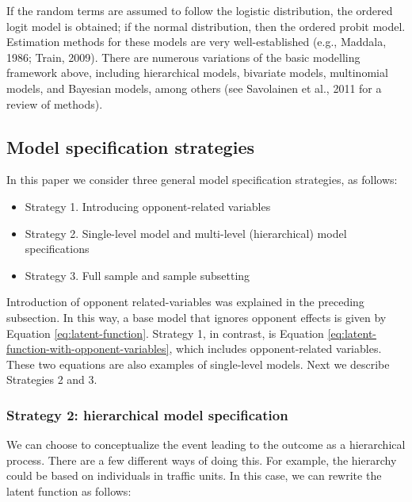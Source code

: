\documentclass[]{elsarticle} %
\providecommand{\tightlist}{%
  \setlength{\itemsep}{0pt}\setlength{\parskip}{0pt}}
\begin{document}
If the random terms are assumed to follow the logistic distribution, the
ordered logit model is obtained; if the normal distribution, then the
ordered probit model. Estimation methods for these models are very
well-established (e.g., Maddala, 1986; Train, 2009). There are numerous
variations of the basic modelling framework above, including
hierarchical models, bivariate models, multinomial models, and Bayesian
models, among others (see Savolainen et al., 2011 for a review of
methods).

\hypertarget{model-specification-strategies}{%
\subsection{Model specification
strategies}\label{model-specification-strategies}}

In this paper we consider three general model specification strategies,
as follows:

\begin{itemize}
\tightlist
\item
  Strategy 1. Introducing opponent-related variables
\item
  Strategy 2. Single-level model and multi-level (hierarchical) model
  specifications
\item
  Strategy 3. Full sample and sample subsetting
\end{itemize}

Introduction of opponent related-variables was explained in the
preceding subsection. In this way, a base model that ignores opponent
effects is given by Equation \ref{eq:latent-function}. Strategy 1, in
contrast, is Equation \ref{eq:latent-function-with-opponent-variables},
which includes opponent-related variables. These two equations are also
examples of single-level models. Next we describe Strategies 2 and 3.

\hypertarget{strategy-2-hierarchical-model-specification}{%
\subsubsection{Strategy 2: hierarchical model
specification}\label{strategy-2-hierarchical-model-specification}}

We can choose to conceptualize the event leading to the outcome as a
hierarchical process. There are a few different ways of doing this. For
example, the hierarchy could be based on individuals in traffic units.
In this case, we can rewrite the latent function as follows:
\end{document}
